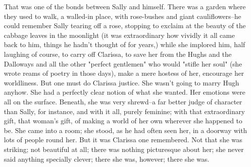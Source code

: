\documentclass[lang=cn,10pt]{elegantbook}
\begin{document}
That was one of the bonds between Sally and himself.  There was a
garden where they used to walk, a walled-in place, with rose-bushes
and giant cauliflowers--he could remember Sally tearing off a rose,
stopping to exclaim at the beauty of the cabbage leaves in the
moonlight (it was extraordinary how vividly it all came back to
him, things he hadn't thought of for years,) while she implored
him, half laughing of course, to carry off Clarissa, to save her
from the Hughs and the Dalloways and all the other "perfect
gentlemen" who would "stifle her soul" (she wrote reams of poetry
in those days), make a mere hostess of her, encourage her
worldliness.  But one must do Clarissa justice.  She wasn't going
to marry Hugh anyhow.  She had a perfectly clear notion of what she
wanted.  Her emotions were all on the surface.  Beneath, she was
very shrewd--a far better judge of character than Sally, for
instance, and with it all, purely feminine; with that extraordinary
gift, that woman's gift, of making a world of her own wherever she
happened to be.  She came into a room; she stood, as he had often
seen her, in a doorway with lots of people round her.  But it was
Clarissa one remembered.  Not that she was striking; not beautiful
at all; there was nothing picturesque about her; she never said
anything specially clever; there she was, however; there she was.
\end{document}
